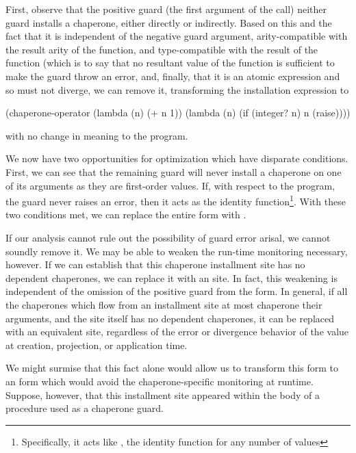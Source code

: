 \documentclass{sigplanconf}
\begin{document}
First, observe that the positive guard (the first argument of the  call) neither guard installs a chaperone, either directly or indirectly.
Based on this and the fact that it is independent of the negative guard argument, arity-compatible with the result arity of the function, and type-compatible with the result of the function (which is to say that no resultant value of the function is sufficient to make the guard throw an error, and, finally, that it is an atomic expression and so must not diverge, we can remove it, transforming the installation expression to
\begin{schemedisplay}
(chaperone-operator
 (lambda (n) (+ n 1))
 (lambda (n)
    (if (integer? n)
        n
        (raise))))
\end{schemedisplay}
with no change in meaning to the program.

We now have two opportunities for optimization which have disparate conditions.
First, we can see that the remaining guard will never install a chaperone on one of its arguments as they are first-order values.
If, with respect to the program, the guard never raises an error, then it acts as the identity function\footnote{Specifically, it acts like , the identity function for any number of values}.
With these two conditions met, we can replace the entire form with .

If our analysis cannot rule out the possibility of guard error arisal, we cannot soundly remove it.
We may be able to weaken the run-time monitoring necessary, however.
If we can establish that this chaperone installment site has no dependent chaperones, we can replace it with an  site.
In fact, this weakening is independent of the omission of the positive guard from the form.
In general, if all the chaperones which flow from an installment site at most chaperone their arguments, and the site itself has no dependent chaperones, it can be replaced with an equivalent  site, regardless of the error or divergence behavior of the value at creation, projection, or application time.




We might surmise that this fact alone would allow us to transform this  form to an  form which would avoid the chaperone-specific monitoring at runtime.
Suppose, however, that this installment site appeared within the body of a procedure used as a chaperone guard.
\end{document}
